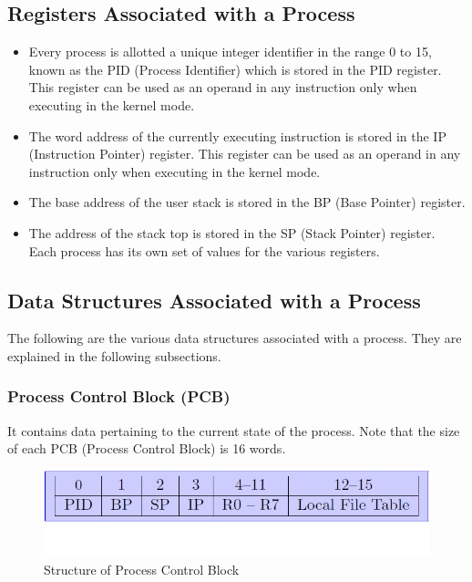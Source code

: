 \documentclass[11pt]{article}
\begin{document}
\subsection{Registers Associated with a Process}

\begin{itemize}
\item Every process is allotted a unique integer identifier in the range 0 to 15, known as the PID (Process Identifier) which is stored in the PID register. This register can be used as an operand in any instruction only when executing in the kernel mode.
\item The word address of the currently executing instruction is stored in the IP (Instruction Pointer) register. This register can be used as an operand in any instruction only when executing in the kernel mode.
\item The base address of the user stack is stored in the BP (Base Pointer) register.
\item The address of the stack top is stored in the SP (Stack Pointer) register. Each process has its own set of values for the various registers.
\end{itemize}


\subsection{Data Structures Associated with a Process}
The following are the various data structures associated with a process. They are explained in the following subsections.

\subsubsection{Process Control Block (PCB)}
It contains data pertaining to the current state of the process.
Note that the size of each PCB (Process Control Block) is 16 words.

\begin{figure}
\begin{center}
\includegraphics[scale=0.5]{pcbblockdiagram.png}
\end{center}
\caption{Structure of Process Control Block}
\end{figure}
\end{document}
